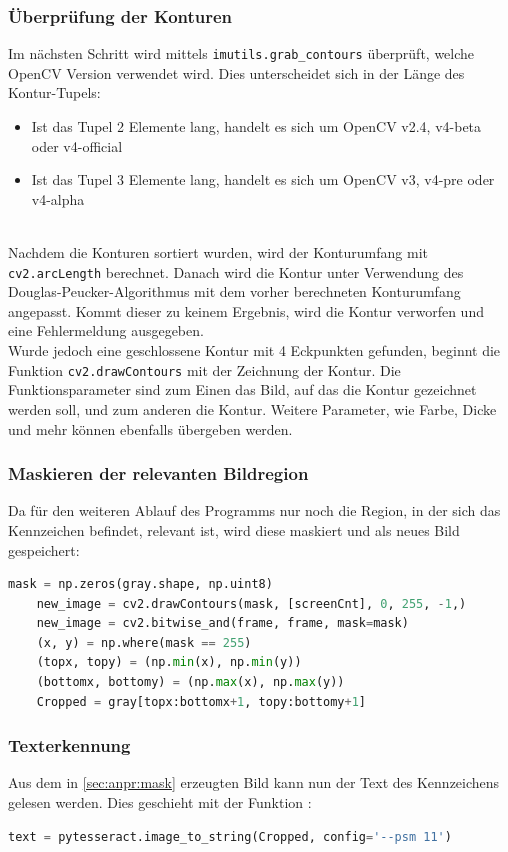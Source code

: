 \subsubsection{Überprüfung der Konturen}
Im nächsten Schritt wird mittels \verb|imutils.grab_contours| überprüft, welche OpenCV Version verwendet wird. Dies unterscheidet sich in der Länge des Kontur-Tupels:
\begin{itemize}
    \item Ist das Tupel 2 Elemente lang, handelt es sich um OpenCV v2.4, v4-beta oder v4-official
    \item Ist das Tupel 3 Elemente lang, handelt es sich um OpenCV v3, v4-pre oder v4-alpha
\end{itemize}
\cite{imutilsGrabContours}\\
Nachdem die Konturen sortiert wurden, wird der Konturumfang mit \verb|cv2.arcLength| berechnet. Danach wird die Kontur unter Verwendung des Douglas-Peucker-Algorithmus mit dem vorher berechneten Konturumfang angepasst. Kommt dieser zu keinem Ergebnis, wird die Kontur verworfen und eine Fehlermeldung ausgegeben.\\
Wurde jedoch eine geschlossene Kontur mit 4 Eckpunkten gefunden, beginnt die Funktion \verb|cv2.drawContours| mit der Zeichnung der Kontur. Die Funktionsparameter sind zum Einen das Bild, auf das die Kontur gezeichnet werden soll, und zum anderen die Kontur. Weitere Parameter, wie Farbe, Dicke und mehr können ebenfalls übergeben werden.
\cite{drawContours}
\subsubsection{Maskieren der relevanten Bildregion \label{sec:anpr:mask}}
Da für den weiteren Ablauf des Programms nur noch die Region, in der sich das Kennzeichen befindet, relevant ist, wird diese maskiert und als neues Bild gespeichert:

\begin{lstlisting}[language=Python, caption=Maskieren der Kennzeichenregion und Abspeichern in neuem Bild, label=lst:impl:anpr:mask]
    mask = np.zeros(gray.shape, np.uint8)
    new_image = cv2.drawContours(mask, [screenCnt], 0, 255, -1,)
    new_image = cv2.bitwise_and(frame, frame, mask=mask)
    (x, y) = np.where(mask == 255)
    (topx, topy) = (np.min(x), np.min(y))
    (bottomx, bottomy) = (np.max(x), np.max(y))
    Cropped = gray[topx:bottomx+1, topy:bottomy+1]
\end{lstlisting}

\subsubsection{Texterkennung \label{sec:anpr:text}}
Aus dem in \ref{sec:anpr:mask} erzeugten Bild kann nun der Text des Kennzeichens gelesen werden. Dies geschieht mit der Funktion :
\begin{lstlisting}[language=Python, caption=Maskieren der Kennzeichenregion und Abspeicher in neuem Bild, label=lst:impl:anpr:text]
    text = pytesseract.image_to_string(Cropped, config='--psm 11')
\end{lstlisting}

